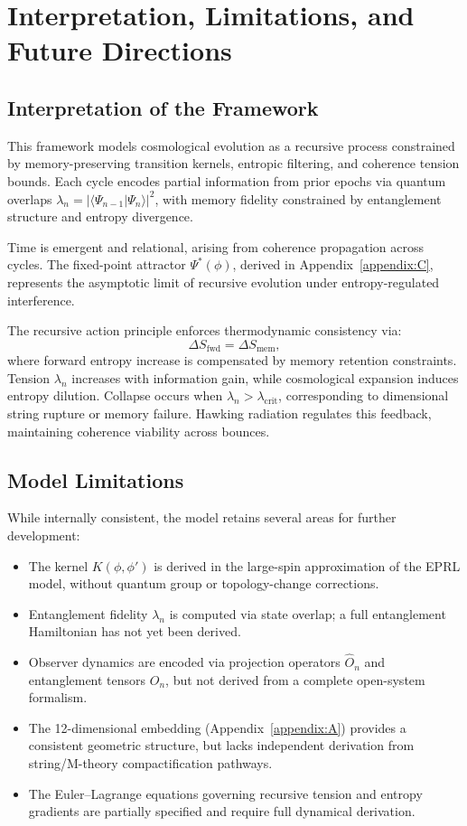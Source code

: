 \section{Interpretation, Limitations, and Future Directions}
\label{sec:interpretation}

\subsection{Interpretation of the Framework}

This framework models cosmological evolution as a recursive process constrained by memory-preserving transition kernels, entropic filtering, and coherence tension bounds. Each cycle encodes partial information from prior epochs via quantum overlaps \( \lambda_n = |\langle \Psi_{n-1} | \Psi_n \rangle|^2 \), with memory fidelity constrained by entanglement structure and entropy divergence.

Time is emergent and relational, arising from coherence propagation across cycles. The fixed-point attractor \( \Psi^*(\phi) \), derived in Appendix~\ref{appendix:C}, represents the asymptotic limit of recursive evolution under entropy-regulated interference.

The recursive action principle enforces thermodynamic consistency via:
\[
\Delta S_{\text{fwd}} = \Delta S_{\text{mem}},
\]
where forward entropy increase is compensated by memory retention constraints. Tension \( \lambda_n \) increases with information gain, while cosmological expansion induces entropy dilution. Collapse occurs when \( \lambda_n > \lambda_{\text{crit}} \), corresponding to dimensional string rupture or memory failure. Hawking radiation regulates this feedback, maintaining coherence viability across bounces.

\subsection{Model Limitations}

While internally consistent, the model retains several areas for further development:

\begin{itemize}
  \item The kernel \( K(\phi, \phi') \) is derived in the large-spin approximation of the EPRL model, without quantum group or topology-change corrections.
  \item Entanglement fidelity \( \lambda_n \) is computed via state overlap; a full entanglement Hamiltonian has not yet been derived.
  \item Observer dynamics are encoded via projection operators \( \hat{O}_n \) and entanglement tensors \( O_n \), but not derived from a complete open-system formalism.
  \item The 12-dimensional embedding (Appendix~\ref{appendix:A}) provides a consistent geometric structure, but lacks independent derivation from string/M-theory compactification pathways.
  \item The Euler–Lagrange equations governing recursive tension and entropy gradients are partially specified and require full dynamical derivation.
\end{itemize}

